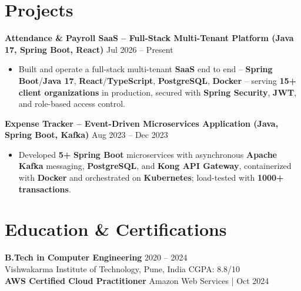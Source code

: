 \documentclass[a4paper,10pt]{article}
\begin{document}
\section*{Projects}

\textbf{Attendance \& Payroll SaaS -- Full-Stack Multi-Tenant Platform (Java 17, Spring Boot, React)} \hfill Jul 2026 -- Present
\begin{itemize}[leftmargin=*]
    \item Built and operate a full-stack multi-tenant \textbf{SaaS} end to end -- \textbf{Spring Boot}/\textbf{Java 17}, \textbf{React}/\textbf{TypeScript}, \textbf{PostgreSQL}, \textbf{Docker} -- serving \textbf{15+ client organizations} in production, secured with \textbf{Spring Security}, \textbf{JWT}, and role-based access control.
\end{itemize}

\textbf{Expense Tracker -- Event-Driven Microservices Application (Java, Spring Boot, Kafka)} \hfill Aug 2023 -- Dec 2023
\begin{itemize}[leftmargin=*]
    \item Developed \textbf{5+} \textbf{Spring Boot} microservices with asynchronous \textbf{Apache Kafka} messaging, \textbf{PostgreSQL}, and \textbf{Kong API Gateway}, containerized with \textbf{Docker} and orchestrated on \textbf{Kubernetes}; load-tested with \textbf{1000+ transactions}.
\end{itemize}

\section*{Education \& Certifications}
\textbf{B.Tech in Computer Engineering} \hfill 2020 -- 2024 \\
Vishwakarma Institute of Technology, Pune, India \hfill CGPA: 8.8/10 \\
\textbf{AWS Certified Cloud Practitioner} \hfill Amazon Web Services \;|\; Oct 2024
\end{document}
